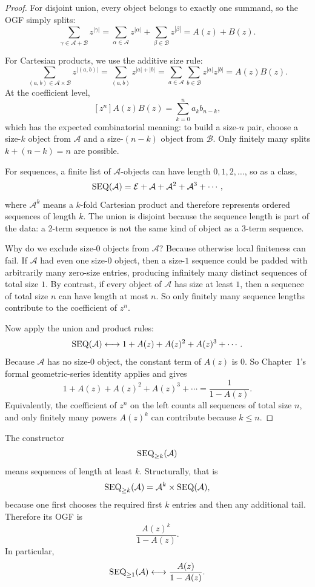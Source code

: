 \begin{proof}
For disjoint union, every object belongs to exactly one summand, so the OGF simply splits:
\[
  \sum_{\gamma \in \mathcal{A}+\mathcal{B}} z^{|\gamma|}
  = \sum_{\alpha \in \mathcal{A}} z^{|\alpha|} + \sum_{\beta \in \mathcal{B}} z^{|\beta|}
  = A(z)+B(z).
\]

For Cartesian products, we use the additive size rule:
\[
  \sum_{(a,b) \in \mathcal{A}\times\mathcal{B}} z^{|(a,b)|}
  = \sum_{(a,b)} z^{|a|+|b|}
  = \sum_{a \in \mathcal{A}} \sum_{b \in \mathcal{B}} z^{|a|}z^{|b|}
  = A(z)B(z).
\]
At the coefficient level,
\[
  [z^n]A(z)B(z) = \sum_{k=0}^n a_k b_{n-k},
\]
which has the expected combinatorial meaning: to build a size-$n$ pair, choose a size-$k$ object from $\mathcal{A}$ and a size-$(n-k)$ object from $\mathcal{B}$. Only finitely many splits $k+(n-k)=n$ are possible.

For sequences, a finite list of $\mathcal{A}$-objects can have length $0,1,2,\dots$, so as a class,
\[
  \operatorname{SEQ}(\mathcal{A}) = \mathcal{E} + \mathcal{A} + \mathcal{A}^2 + \mathcal{A}^3 + \cdots,
\]
where $\mathcal{A}^k$ means a $k$-fold Cartesian product and therefore represents ordered sequences of length $k$. The union is disjoint because the sequence length is part of the data: a 2-term sequence is not the same kind of object as a 3-term sequence.

Why do we exclude size-$0$ objects from $\mathcal{A}$? Because otherwise local finiteness can fail. If $\mathcal{A}$ had even one size-$0$ object, then a size-$1$ sequence could be padded with arbitrarily many zero-size entries, producing infinitely many distinct sequences of total size $1$. By contrast, if every object of $\mathcal{A}$ has size at least $1$, then a sequence of total size $n$ can have length at most $n$. So only finitely many sequence lengths contribute to the coefficient of $z^n$.

Now apply the union and product rules:
\[
  \operatorname{SEQ}(\mathcal{A}) \longleftrightarrow 1 + A(z) + A(z)^2 + A(z)^3 + \cdots.
\]
Because $\mathcal{A}$ has no size-$0$ object, the constant term of $A(z)$ is $0$. So Chapter~1's formal geometric-series identity applies and gives
\[
  1 + A(z) + A(z)^2 + A(z)^3 + \cdots = \frac{1}{1-A(z)}.
\]
Equivalently, the coefficient of $z^n$ on the left counts all sequences of total size $n$, and only finitely many powers $A(z)^k$ can contribute because $k \le n$.
\end{proof}

\begin{remark}
The constructor
\[
  \operatorname{SEQ}_{\ge k}(\mathcal{A})
\]
means sequences of length at least $k$. Structurally, that is
\[
  \operatorname{SEQ}_{\ge k}(\mathcal{A}) = \mathcal{A}^k \times \operatorname{SEQ}(\mathcal{A}),
\]
because one first chooses the required first $k$ entries and then any additional tail. Therefore its OGF is
\[
  \frac{A(z)^k}{1-A(z)}.
\]
In particular,
\[
  \operatorname{SEQ}_{\ge 1}(\mathcal{A}) \longleftrightarrow \frac{A(z)}{1-A(z)}.
\]
\end{remark}

